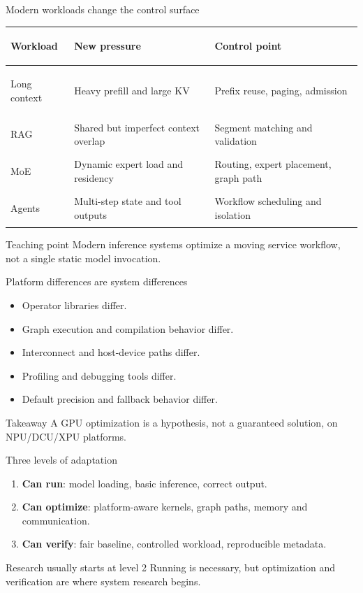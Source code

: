 \documentclass[aspectratio=169,11pt]{beamer}
\newcommand{\term}[1]{\textcolor{HUSTBlue}{\textbf{#1}}}
\begin{document}
\begin{frame}{Modern workloads change the control surface}
  \small
  \begin{tabularx}{\textwidth}{>{\bfseries\raggedright\arraybackslash}p{2.2cm}YY}
    \toprule
    Workload & New pressure & Control point \\
    \midrule
    Long context & Heavy prefill and large KV & Prefix reuse, paging, admission \\
    RAG & Shared but imperfect context overlap & Segment matching and validation \\
    MoE & Dynamic expert load and residency & Routing, expert placement, graph path \\
    Agents & Multi-step state and tool outputs & Workflow scheduling and isolation \\
    \bottomrule
  \end{tabularx}
  \vspace{0.28cm}
  \begin{block}{Teaching point}
    Modern inference systems optimize a moving service workflow, not a single static model invocation.
  \end{block}
\end{frame}

\begin{frame}{Platform differences are system differences}
  \begin{itemize}
    \item Operator libraries differ.
    \item Graph execution and compilation behavior differ.
    \item Interconnect and host-device paths differ.
    \item Profiling and debugging tools differ.
    \item Default precision and fallback behavior differ.
  \end{itemize}
  \vspace{0.32cm}
  \begin{block}{Takeaway}
    A GPU optimization is a hypothesis, not a guaranteed solution, on NPU/DCU/XPU platforms.
  \end{block}
\end{frame}

\begin{frame}{Three levels of adaptation}
  \begin{enumerate}
    \item \term{Can run}: model loading, basic inference, correct output.
    \item \term{Can optimize}: platform-aware kernels, graph paths, memory and communication.
    \item \term{Can verify}: fair baseline, controlled workload, reproducible metadata.
  \end{enumerate}
  \vspace{0.35cm}
  \begin{block}{Research usually starts at level 2}
    Running is necessary, but optimization and verification are where system research begins.
  \end{block}
\end{frame}
\end{document}
